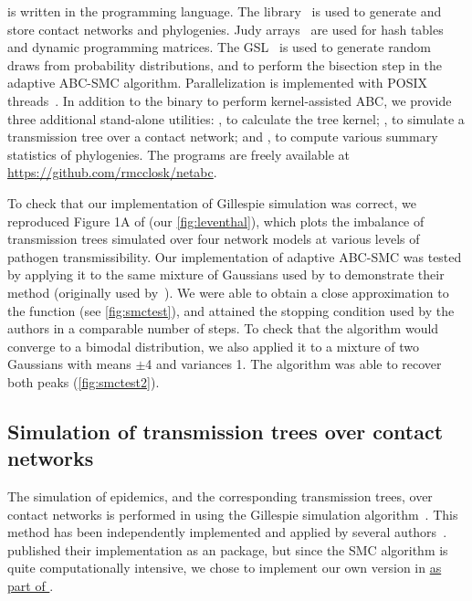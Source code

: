  is written in the  programming language. The
 library~\autocite{csardi2006igraph} is used to generate and
store contact networks and phylogenies. Judy arrays~\autocite{baskins2004judy}
are used for hash tables and dynamic programming matrices. The
\gls{GSL}~\autocite{gough2009gnu} is used to generate random draws from
probability distributions, and to perform the bisection step in the adaptive
\gls{ABC}-\gls{SMC} algorithm. Parallelization is implemented with \gls{POSIX}
threads~\autocite{barney2009posix}. In addition to the  binary
to perform kernel-assisted \gls{ABC}, we provide three additional stand-alone
utilities: , to calculate the tree kernel;
, to simulate a transmission tree over a contact network; and
, to compute various summary statistics of phylogenies. The
programs are freely available at \url{https://github.com/rmcclosk/netabc}.

To check that our implementation of Gillespie simulation was correct, we
reproduced Figure 1A of \textcite{leventhal2012inferring} (our
\cref{fig:leventhal}), which plots the imbalance of transmission trees
simulated over four network models at various levels of pathogen
transmissibility. Our implementation of adaptive \gls{ABC}-\gls{SMC} was tested
by applying it to the same mixture of Gaussians used by
\textcite{del2012adaptive} to demonstrate their method (originally used
by~\textcite{sisson2007sequential}). We were able to obtain a close
approximation to the function (see \cref{fig:smctest}), and attained the
stopping condition used by the authors in a comparable number of steps. To
check that the algorithm would converge to a bimodal distribution, we also
applied it to a mixture of two Gaussians with means $\pm$4 and variances 1. The
algorithm was able to recover both peaks (\cref{fig:smctest2}).

\subsection{Simulation of transmission trees over contact networks}
\label{subsec:nettree}

The simulation of epidemics, and the corresponding transmission trees, over
contact networks is performed in  using the Gillespie
simulation algorithm~\autocite{gillespie1976general}. This method has been
independently implemented and applied by several
authors~\autocite[\textit{e.g.}][]{o2011contact, robinson2013dynamics,
leventhal2012inferring, groendyke2011bayesian, villandre2016assessment}.
\textcite{groendyke2011bayesian} published their implementation as an
 package, but since the \gls{SMC} algorithm is quite
computationally intensive, we chose to implement our own version in
 {\color{blue}\uline{as part of }}.

